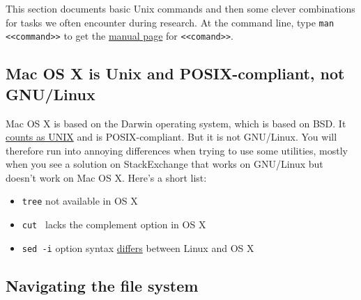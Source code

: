 \label{entry:unixshelltips}

This section documents basic Unix commands and then some clever combinations for tasks we often encounter during research.
At the command line, type \texttt{man <<command>>} to get the \href{https://en.wikipedia.org/wiki/Man_page}{manual page} for \texttt{<<comand>>}.

\subsection{Mac OS X is Unix and POSIX-compliant, not GNU/Linux}

Mac OS X is based on the Darwin operating system, which is based on BSD.
It \href{https://www.opengroup.org/openbrand/register/apple.htm}{counts as UNIX} and is POSIX-compliant.
But it is not GNU/Linux. 
You will therefore run into annoying differences when trying to use some utilities, mostly when you see a solution on StackExchange that works on GNU/Linux but doesn't work on Mac OS X.
Here's a short list:
\begin{itemize}
\item \texttt{tree} not available in OS X
\item \texttt{cut } lacks the complement option in OS X
\item \texttt{sed -i} option syntax \href{https://stackoverflow.com/questions/2320564/i-need-my-sed-i-command-for-in-place-editing-to-work-with-both-gnu-sed-and-bsd}{differs} between Linux and OS X
\end{itemize}


\subsection{Navigating the file system}

